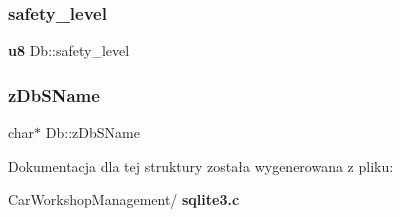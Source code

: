 \subsubsection{safety\_level}
{\footnotesize\ttfamily \textbf{ u8} Db\+::safety\+\_\+level}

\mbox{\label{struct_db_a3129038e85466e764d1c866af0c9b3a2}} 
\subsubsection{zDbSName}
{\footnotesize\ttfamily char$\ast$ Db\+::z\+Db\+S\+Name}



Dokumentacja dla tej struktury została wygenerowana z pliku\+:\begin{DoxyCompactItemize}
\item 
Car\+Workshop\+Management/\textbf{ sqlite3.\+c}\end{DoxyCompactItemize}
